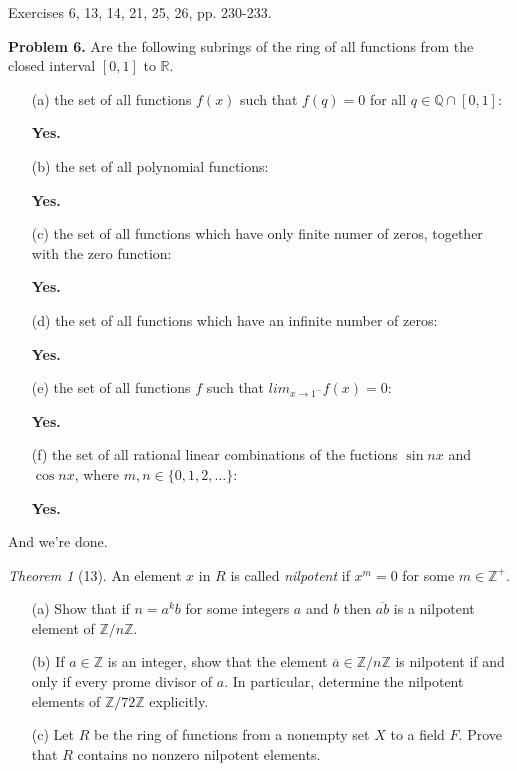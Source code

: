 \documentclass[12pt]{article}
\theoremstyle{remark}
\theoremstyle{named}
\newtheorem*{theorem}{Theorem}
\newcommand{\Z}{\mathbb Z}
\begin{document}
Exercises 6, 13, 14, 21, 25, 26, pp. 230-233.

\textbf{Problem 6.} Are the following subrings of the ring of all functions from the closed interval \([0, 1]\) to \(\mathbb R\).
\begin{enumerate}
    \item[(a)] the set of all functions \(f(x)\) such that \(f(q) = 0\) for all \(q \in \mathbb Q \cap [0, 1]\): 
    
    \textbf{Yes.}

    \item[(b)] the set of all polynomial functions: 
    
    \textbf{Yes.}
    
    \item[(c)] the set of all functions which have only finite numer of zeros, together with the zero function: 
    
    \textbf{Yes.}
    
    \item[(d)] the set of all functions which have an infinite number of zeros: 
    
    \textbf{Yes.}
    
    \item[(e)] the set of all functions \(f\) such that \(lim_{x \to 1^-} f(x) = 0\): 
    
    \textbf{Yes.}
    
    \item[(f)] the set of all rational linear combinations of the fuctions \(\sin nx\) and \(\cos nx\), where \(m, n \in \{0, 1, 2, \dots\}\): 
    
    \textbf{Yes.}
    
\end{enumerate}
And we're done.
\newline

\begin{theorem}[13]
    An element \(x\) in \(R\) is called \textit{nilpotent} if \(x^m = 0\) for some \(m \in \Z^+\).
    \begin{enumerate}
        \item[(a)] Show that if \(n = a^kb\) for some integers \(a\) and \(b\) then \(\overline{ab}\) is a nilpotent element of \(\Z / n \Z\). 
        \item[(b)] If \(a \in \Z\) is an integer, show that the element \(\overline{a} \in \Z / n \Z\) is nilpotent if and only if every prome divisor of \(a\). In particular, determine the nilpotent elements of \(\Z / 72 \Z\) explicitly.
        \item[(c)] Let \(R\) be the ring of functions from a nonempty set \(X\) to a field \(F\). Prove that \(R\) contains no nonzero nilpotent elements.
    \end{enumerate}
\end{theorem}
\end{document}
